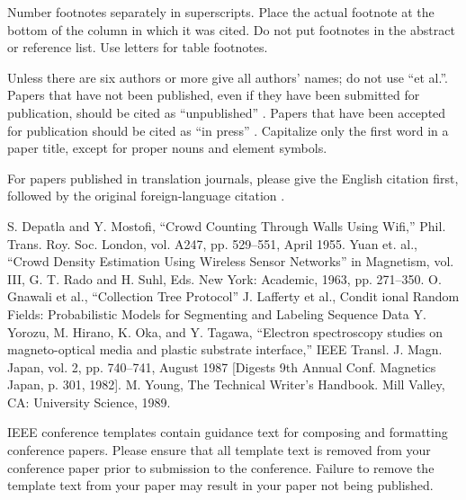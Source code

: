\documentclass[conference]{IEEEtran}
\begin{document}
Number footnotes separately in superscripts. Place the actual footnote at 
the bottom of the column in which it was cited. Do not put footnotes in the 
abstract or reference list. Use letters for table footnotes.

Unless there are six authors or more give all authors' names; do not use 
``et al.''. Papers that have not been published, even if they have been 
submitted for publication, should be cited as ``unpublished'' \cite{b4}. Papers 
that have been accepted for publication should be cited as ``in press'' \cite{b5}. 
Capitalize only the first word in a paper title, except for proper nouns and 
element symbols.

For papers published in translation journals, please give the English 
citation first, followed by the original foreign-language citation \cite{b6}.

\begin{thebibliography}{00}
 S. Depatla and Y. Mostofi, ``Crowd Counting Through Walls Using Wifi,'' Phil. Trans. Roy. Soc. London, vol. A247, pp. 529--551, April 1955.
 Yuan et. al., ``Crowd Density Estimation Using Wireless Sensor Networks'' in Magnetism, vol. III, G. T. Rado and H. Suhl, Eds. New York: Academic, 1963, pp. 271--350.
 O. Gnawali et al., ``Collection Tree Protocol''
 J. Lafferty et al., Condit
ional Random Fields: Probabilistic Models for Segmenting and Labeling Sequence Data
 Y. Yorozu, M. Hirano, K. Oka, and Y. Tagawa, ``Electron spectroscopy studies on magneto-optical media and plastic substrate interface,'' IEEE Transl. J. Magn. Japan, vol. 2, pp. 740--741, August 1987 [Digests 9th Annual Conf. Magnetics Japan, p. 301, 1982].
 M. Young, The Technical Writer's Handbook. Mill Valley, CA: University Science, 1989.
\end{thebibliography}
\vspace{12pt}
\color{red}
IEEE conference templates contain guidance text for composing and formatting conference papers. Please ensure that all template text is removed from your conference paper prior to submission to the conference. Failure to remove the template text from your paper may result in your paper not being published.
\end{document}
